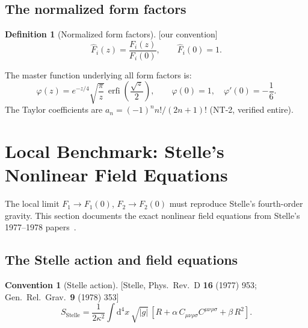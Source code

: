 \documentclass[12pt,a4paper]{article}
\theoremstyle{definition}
\newtheorem{definition}[proposition]{Definition}
\newtheorem{convention}[proposition]{Convention}
\theoremstyle{remark}
\newcommand{\Weylsq}{C_{\mu\nu\rho\sigma}C^{\mu\nu\rho\sigma}}
\newcommand{\dd}{\mathrm{d}}
\newcommand{\erfi}{\operatorname{erfi}}
\newcommand{\fromlit}[1]{\textcolor{blue!70!black}{\textsf{[#1]}}}
\newcommand{\oursign}{\textcolor{teal!80!black}{\textsf{[our convention]}}}
\begin{document}
\subsection{The normalized form factors}

\begin{definition}[Normalized form factors]
\label{def:Fhat}
\oursign\;
\begin{equation}
  \hat{F}_i(z) = \frac{F_i(z)}{F_i(0)}, \qquad \hat{F}_i(0) = 1.
\end{equation}
\end{definition}

The master function underlying all form factors is:
\begin{equation}\label{eq:phi-master}
  \varphi(z) = e^{-z/4}\sqrt{\frac{\pi}{z}}\,\erfi\!\left(\frac{\sqrt{z}}{2}\right),
  \qquad \varphi(0) = 1, \quad \varphi'(0) = -\frac{1}{6}.
\end{equation}
The Taylor coefficients are $a_n = (-1)^n n!/(2n+1)!$ (NT-2, verified
entire).


\section{Local Benchmark: Stelle's Nonlinear Field Equations}
\label{sec:stelle}

The local limit $F_1 \to F_1(0)$, $F_2 \to F_2(0)$ must reproduce
Stelle's fourth-order gravity.  This section documents the exact
nonlinear field equations from Stelle's 1977--1978
papers~\cite{Stelle1977,Stelle1978}.

\subsection{The Stelle action and field equations}

\begin{convention}[Stelle action]
\label{conv:stelle}
\fromlit{Stelle, Phys.\ Rev.\ D \textbf{16} (1977) 953;
Gen.\ Rel.\ Grav.\ \textbf{9} (1978) 353}
\begin{equation}\label{eq:stelle-action}
  S_{\mathrm{Stelle}} = \frac{1}{2\kappa^2}\int\dd^4 x\,\sqrt{|g|}\,
  \left[R + \alpha\,\Weylsq + \beta\,R^2\right].
\end{equation}
\end{convention}
\end{document}
